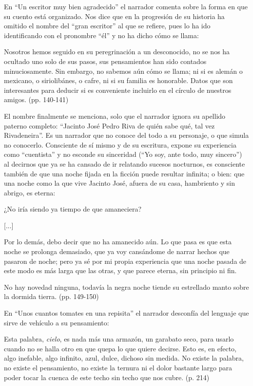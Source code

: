 \documentclass[14pt,twoside,final]{extbook} %
\begin{document}
En ``Un escritor muy bien agradecido'' el narrador comenta sobre la forma en que su cuento está organizado. Nos dice que en la progresión de su historia ha omitido el nombre del ``gran escritor'' al que se refiere, pues lo ha ido identificando con el pronombre ``él'' y no ha dicho cómo se llama:
\begin{quoting}
Nosotros hemos seguido en su peregrinación a un desconocido, no se nos ha ocultado uno solo de sus pasos, sus pensamientos han sido contados minuciosamente. Sin embargo, no sabemos aún cómo se llama; ni si es alemán o mexicano, o siriolibánes, o cafre, ni si su familia es honorable. Datos que son interesantes para deducir si es conveniente incluirlo en el círculo de nuestros amigos. (pp. 140-141)
\end{quoting}
El nombre finalmente se menciona, solo que el narrador ignora su apellido paterno completo: ``Jacinto José Pedro Riva de quién sabe qué, tal vez Rivadeneira''. Es un narrador que no conoce del todo a su personaje, o que simula no conocerlo. Consciente de sí mismo y de su escritura, expone su experiencia como ``cuentista'' y no esconde su sinceridad (``Yo soy, ante todo, muy sincero'') al decirnos que ya se ha cansado de ir relatando sucesos nocturnos, es consciente también de que una noche fijada en la ficción puede resultar infinita; o bien: que una noche como la que vive Jacinto José, afuera de su casa, hambriento y sin abrigo, es eterna:
\begin{quoting}
¿No iría siendo ya tiempo de que amaneciera?

\centerline{[...]}

Por lo demás, debo decir que no ha amanecido aún. Lo que pasa es que esta noche se prolonga demasiado, que ya voy cansándome de narrar hechos que pasaron de noche; pero ya sé por mi propia experiencia que una noche pasada de este modo es más larga que las otras, y que parece eterna, sin principio ni fin.

No hay novedad ninguna, todavía la negra noche tiende su estrellado manto sobre la dormida tierra. (pp. 149-150)
\end{quoting}
En ``Unos cuantos tomates en una repisita'' el narrador desconfía del lenguaje que sirve de vehículo a su pensamiento:
\begin{quoting}
Esta palabra, \emph{cielo}, es nada más una armazón, un garabato seco, para usarlo cuando no se halla otro en que quepa lo que quiere decirse. Esto es, en efecto, algo inefable, algo infinito, azul, dulce, dichoso sin medida. No existe la palabra, no existe el pensamiento, no existe la ternura ni el dolor bastante largo para poder tocar la cuenca de este techo sin techo que nos cubre. (p. 214)
\end{quoting}
\end{document}
